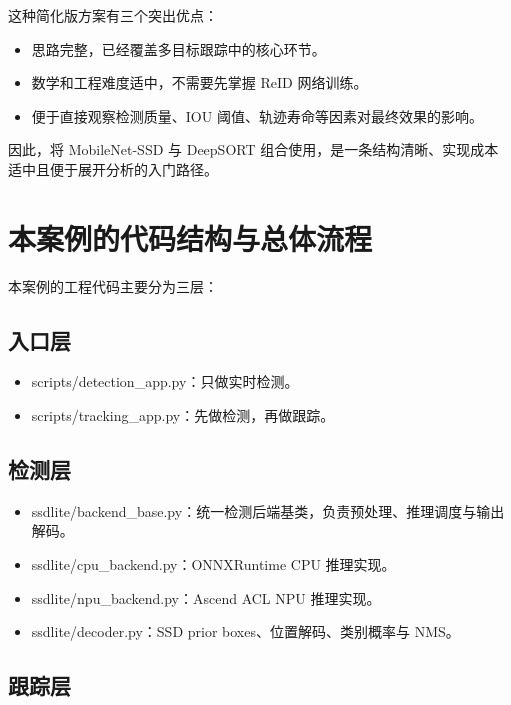 这种简化版方案有三个突出优点：

\begin{itemize}
\tightlist
\item
  思路完整，已经覆盖多目标跟踪中的核心环节。
\item
  数学和工程难度适中，不需要先掌握 ReID 网络训练。
\item
  便于直接观察检测质量、IOU 阈值、轨迹寿命等因素对最终效果的影响。
\end{itemize}

因此，将 MobileNet-SSD 与 DeepSORT
组合使用，是一条结构清晰、实现成本适中且便于展开分析的入门路径。

\section{本案例的代码结构与总体流程}\label{src-experiment-case2-h20}

本案例的工程代码主要分为三层：

\subsection{入口层}\label{src-experiment-case2-h21}

\begin{itemize}
\tightlist
\item
  scripts/detection\_app.py：只做实时检测。
\item
  scripts/tracking\_app.py：先做检测，再做跟踪。
\end{itemize}

\subsection{检测层}\label{src-experiment-case2-h22}

\begin{itemize}
\tightlist
\item
  ssdlite/backend\_base.py：统一检测后端基类，负责预处理、推理调度与输出解码。
\item
  ssdlite/cpu\_backend.py：ONNXRuntime CPU 推理实现。
\item
  ssdlite/npu\_backend.py：Ascend ACL NPU 推理实现。
\item
  ssdlite/decoder.py：SSD prior boxes、位置解码、类别概率与 NMS。
\end{itemize}

\subsection{跟踪层}\label{src-experiment-case2-h23}

